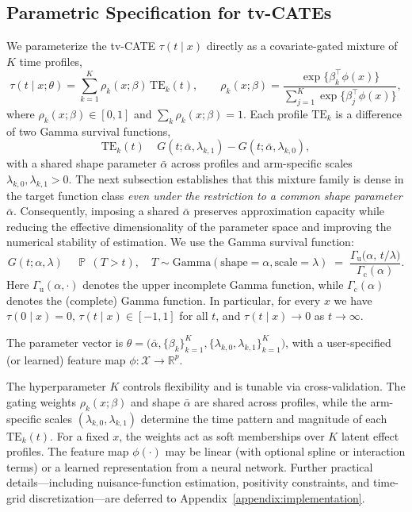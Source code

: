 \documentclass{article}
\DeclareMathOperator*{\eqdef }{\,\stackrel{\text{def}}{=}\,}
\DeclareMathOperator{\PR}{\mathbb{P}\,}
\begin{document}
\subsection{Parametric Specification for tv-CATEs}
\label{subsec:param_spec}
We parameterize the tv-CATE $\tau(t\mid x)$ directly as a covariate-gated mixture of $K$ time profiles,
\[
\tau(t\mid x;\theta)
=\sum_{k=1}^{K}\rho_k(x;\beta)\,\mathrm{TE}_k(t),
\qquad
\rho_k(x;\beta)
=\frac{\exp\{\beta_k^{\top}\phi(x)\}}{\sum_{j=1}^{K}\exp\{\beta_j^{\top}\phi(x)\}},
\]
where $\rho_k(x;\beta)\in[0,1]$ and $\sum_k\rho_k(x;\beta)=1$.
Each profile $\mathrm{TE}_k$ is a difference of two Gamma survival functions,
\[
\mathrm{TE}_k(t)
\;\eqdef\;
G(t;\bar\alpha,\lambda_{k,1})-G(t;\bar\alpha,\lambda_{k,0}),
\]
with a shared shape parameter $\bar\alpha$ across profiles and arm-specific scales $\lambda_{k,0},\lambda_{k,1}>0$.
The next subsection establishes that this mixture family is dense in the target function class \emph{even under the restriction to a common shape parameter} $\bar\alpha$. Consequently, imposing a shared $\bar\alpha$ preserves approximation capacity while reducing the effective dimensionality of the parameter space and improving the numerical stability of estimation. We use the Gamma survival function:
\[
G(t;\alpha,\lambda)
\;\eqdef\;
\PR(T>t),\quad T\sim\mathrm{Gamma}(\text{shape}=\alpha,\text{scale}=\lambda)
\;=\;
\frac{\Gamma_{\mathrm{u}}\!\big(\alpha,\,t/\lambda\big)}{\Gamma_\mathrm{c}(\alpha)}.
\]
Here $\Gamma_{\mathrm{u}}(\alpha,\cdot)$ denotes the upper incomplete Gamma function, while $\Gamma_\mathrm{c}(\alpha)$ denotes the (complete) Gamma function.
In particular, for every $x$ we have $\tau(0\mid x)=0$, $\tau(t\mid x)\in[-1,1]$ for all $t$, and $\tau(t\mid x)\to 0$ as $t\to\infty$.

The parameter vector is
$\theta=\big(\bar\alpha,\{\beta_k\}_{k=1}^{K},\{\lambda_{k,0},\lambda_{k,1}\}_{k=1}^{K}\big)$,
with a user-specified (or learned) feature map $\phi:\mathcal{X}\to\mathbb{R}^{p}$.

The hyperparameter $K$ controls flexibility and is tunable via cross-validation.
The gating weights $\rho_k(x;\beta)$ and shape $\bar\alpha$ are shared across profiles, while the arm-specific scales $(\lambda_{k,0},\lambda_{k,1})$ determine the time pattern and magnitude of each $\mathrm{TE}_k(t)$.
For a fixed $x$, the weights act as soft memberships over $K$ latent effect profiles.
The feature map $\phi(\cdot)$ may be linear (with optional spline or interaction terms) or a learned representation from a neural network.
Further practical details---including nuisance-function estimation, positivity constraints, and time-grid discretization---are deferred to Appendix~\ref{appendix:implementation}.
\end{document}
